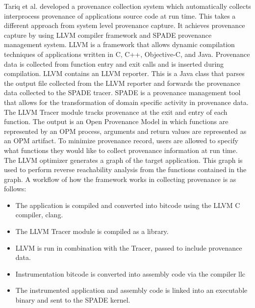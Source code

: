 Tariq et al. \cite{tariq_towards_2012} developed a provenance collection system which automatically collects interprocess provenance of applications source code at run time. This takes a different approach from system level provenance capture. It achieves provenance capture by using LLVM compiler framework and SPADE provenance management system. LLVM is a framework that allows dynamic compilation techniques of applications written in C, C++, Objective-C, and Java. Provenance data is collected from function entry and exit calls and is inserted during compilation. LLVM contains an LLVM reporter. This is a Java class that parses the output file collected from the LLVM reporter and forwards the provenance data collected to the SPADE tracer. SPADE is a provenance management tool that allows for the transformation of domain specific activity in provenance data. The LLVM Tracer module tracks provenance at the exit and entry of each function. The output is an Open Provenance Model in which functions are represented by an OPM process, arguments and return values are represented as an OPM artifact. To minimize provenance record, users are allowed to specify what functions they would like to collect provenance information at run time. The LLVM optimizer generates a graph of the target application. This graph is used to perform reverse reachability analysis  from the functions contained in the graph. A workflow of how the framework works in collecting provenance is as follows:

\begin{itemize}
\item The application is compiled and converted into bitcode using the LLVM C compiler, clang.

\item The LLVM Tracer module is compiled as a library.

\item LLVM is run in combination with the Tracer, passed to include provenance data. 

\item Instrumentation bitcode is converted into assembly code via the compiler llc



\item  The instrumented application and assembly code is linked into an executable binary and sent to the SPADE kernel.
\end{itemize}


